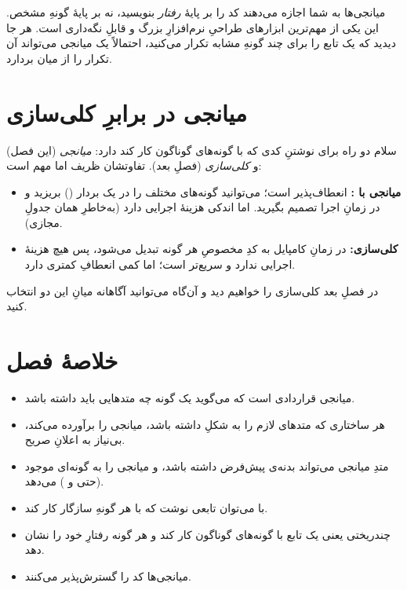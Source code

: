 \begin{tip}
میانجی‌ها به شما اجازه می‌دهند کد را بر پایهٔ \emph{رفتار} بنویسید، نه بر پایهٔ
گونهِ مشخص. این یکی از مهم‌ترین ابزارهای طراحیِ نرم‌افزارِ بزرگ و قابلِ نگه‌داری
است. هر جا دیدید که یک تابع را برای چند گونهِ مشابه تکرار می‌کنید، احتمالاً یک
میانجی می‌تواند آن تکرار را از میان بردارد.
\end{tip}

\section{میانجی در برابرِ کلی‌سازی}

سلام دو راه برای نوشتنِ کدی که با گونه‌های گوناگون کار کند دارد: \emph{میانجی}
(این فصل) و \emph{کلی‌سازی} (فصلِ بعد). تفاوتشان ظریف اما مهم است:

\begin{itemize}
  \item \textbf{میانجی با :} انعطاف‌پذیر است؛ می‌توانید گونه‌های مختلف
        را در یک بردار () بریزید و در زمانِ اجرا تصمیم
        بگیرید. اما اندکی هزینهٔ
        اجرایی دارد (به‌خاطرِ همان جدولِ مجازی).
  \item \textbf{کلی‌سازی:} در زمانِ کامپایل به کدِ مخصوصِ هر گونه تبدیل می‌شود،
        پس هیچ هزینهٔ اجرایی ندارد و سریع‌تر است؛ اما کمی انعطافِ کمتری دارد.
\end{itemize}

در فصلِ بعد کلی‌سازی را خواهیم دید و آن‌گاه می‌توانید آگاهانه میانِ این دو
انتخاب کنید.

\section{خلاصهٔ فصل}

\begin{itemize}
  \item میانجی قراردادی است که می‌گوید یک گونه چه متدهایی باید داشته باشد.
  \item هر ساختاری که متدهای لازم را به شکلِ  داشته باشد، میانجی را
        برآورده می‌کند، بی‌نیاز به اعلانِ صریح.
  \item متدِ میانجی می‌تواند بدنه‌ی پیش‌فرض داشته باشد، و 
        میانجی را به گونه‌ای موجود (حتی  و ) می‌دهد.
  \item با  می‌توان تابعی نوشت که با هر گونهِ سازگار کار کند.
  \item چندریختی یعنی یک تابع با گونه‌های گوناگون کار کند و هر گونه رفتارِ خود را
        نشان دهد.
  \item میانجی‌ها کد را گسترش‌پذیر می‌کنند.
\end{itemize}

